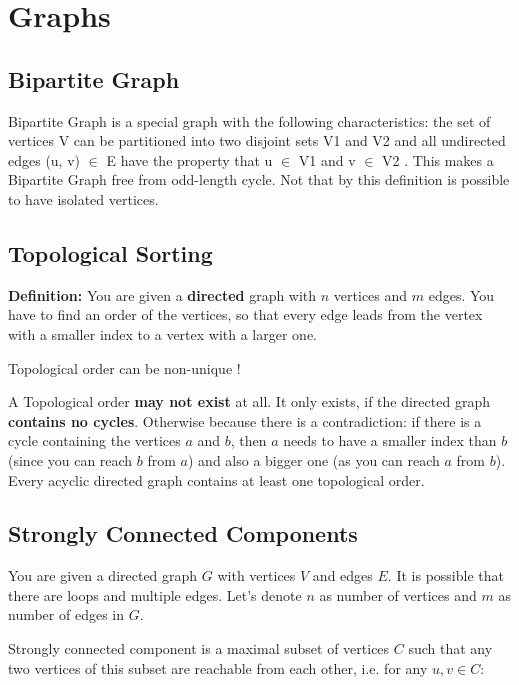 \section{Graphs}





\subsection{Bipartite Graph}

Bipartite Graph is a special graph with the following characteristics: the set of vertices V can be partitioned into two disjoint sets V1 and V2 and all undirected edges (u, v) $\in$ E have the property that u $\in$ V1 and v $\in$ V2 . This makes a Bipartite Graph free from odd-length cycle.
Not that by this definition is possible to have isolated vertices.

\subsection{Topological Sorting}

\textbf{Definition:} You are given a \textbf{directed} graph with $n$ vertices and $m$ edges. You have to find an order of the vertices, so that every edge leads from the vertex with a smaller index to a vertex with a larger one.

Topological order can be non-unique !

A Topological order \textbf{may not exist} at all. It only exists, if the directed graph \textbf{contains no cycles}. Otherwise because there is a contradiction: if there is a cycle containing the vertices $a$ and $b$, then $a$ needs to have a smaller index than $b$ (since you can reach $b$ from $a$) and also a bigger one (as you can reach $a$ from $b$). Every acyclic directed graph contains at least one topological order.

\subsection{Strongly Connected Components}

You are given a directed graph $G$ with vertices $V$ and edges $E$. It is possible that there are loops and multiple edges. Let's denote $n$ as number of vertices and $m$ as number of edges in $G$.

Strongly connected component is a maximal subset of vertices
$C$ such that any two vertices of this subset are reachable from each other, i.e. for any $u, v \in C$:

